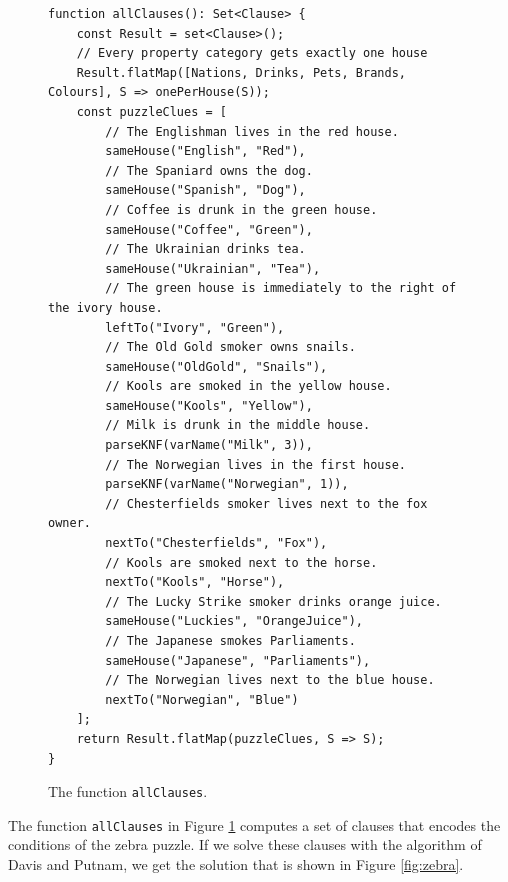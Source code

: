 \begin{figure}[!ht]
\centering
\begin{verbatim}
function allClauses(): Set<Clause> {
    const Result = set<Clause>();
    // Every property category gets exactly one house
    Result.flatMap([Nations, Drinks, Pets, Brands, Colours], S => onePerHouse(S));
    const puzzleClues = [
        // The Englishman lives in the red house.
        sameHouse("English", "Red"),
        // The Spaniard owns the dog.
        sameHouse("Spanish", "Dog"), 
        // Coffee is drunk in the green house.
        sameHouse("Coffee", "Green"),
        // The Ukrainian drinks tea.
        sameHouse("Ukrainian", "Tea"),
        // The green house is immediately to the right of the ivory house.
        leftTo("Ivory", "Green"), 
        // The Old Gold smoker owns snails.
        sameHouse("OldGold", "Snails"), 
        // Kools are smoked in the yellow house.
        sameHouse("Kools", "Yellow"), 
        // Milk is drunk in the middle house.
        parseKNF(varName("Milk", 3)), 
        // The Norwegian lives in the first house.
        parseKNF(varName("Norwegian", 1)), 
        // Chesterfields smoker lives next to the fox owner.
        nextTo("Chesterfields", "Fox"),                                         
        // Kools are smoked next to the horse.
        nextTo("Kools", "Horse"), 
        // The Lucky Strike smoker drinks orange juice.
        sameHouse("Luckies", "OrangeJuice"),                                              
        // The Japanese smokes Parliaments.
        sameHouse("Japanese", "Parliaments"), 
        // The Norwegian lives next to the blue house.
        nextTo("Norwegian", "Blue") 
    ];
    return Result.flatMap(puzzleClues, S => S);
}
\end{verbatim}
\vspace*{-0.3cm}
\caption{The function \texttt{allClauses}.}
\label{fig:allClauses}
\end{figure}
The function \texttt{allClauses} in Figure \ref{fig:allClauses} computes a set of clauses that encodes the
conditions of the zebra puzzle.  If we solve these clauses with the algorithm of
Davis and Putnam, we get the solution that is shown in Figure \ref{fig:zebra}.

